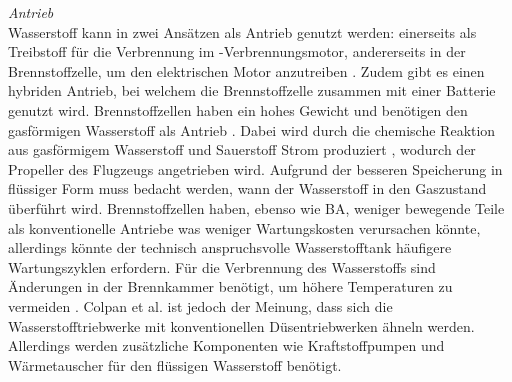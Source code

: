 \textit{Antrieb}\\
Wasserstoff kann in zwei Ansätzen als Antrieb genutzt werden: 
einerseits als Treibstoff für die Verbrennung im -Verbrennungsmotor,
andererseits in der Brennstoffzelle, um den elektrischen Motor anzutreiben \cite{sky2020hydrogen}. 
Zudem gibt es einen hybriden Antrieb, bei welchem die Brennstoffzelle zusammen mit einer Batterie genutzt wird.
%
Brennstoffzellen haben ein hohes Gewicht \cite{hepperle2012electric} und 
benötigen den gasförmigen Wasserstoff als Antrieb \cite{colpan2022fuel}.
Dabei wird durch die chemische Reaktion aus gasförmigem Wasserstoff  und Sauerstoff  Strom produziert \cite{dalmia2022powering}, 
wodurch der Propeller des Flugzeugs angetrieben wird. Aufgrund der besseren Speicherung in flüssiger Form muss bedacht werden, wann der Wasserstoff in den Gaszustand überführt wird. 
Brennstoffzellen haben, ebenso wie BA, weniger bewegende Teile als konventionelle Antriebe \cite{dalmia2022powering} was weniger Wartungskosten verursachen könnte,
allerdings könnte der technisch anspruchsvolle Wasserstofftank häufigere Wartungszyklen erfordern.
%
%
%
%
Für die Verbrennung des Wasserstoffs sind Änderungen in der Brennkammer benötigt, um höhere Temperaturen zu vermeiden \cite{khandelwal2013hydrogen}.
Colpan et al. \cite{colpan2022fuel} ist jedoch der Meinung, dass sich die Wasserstofftriebwerke mit konventionellen Düsentriebwerken ähneln werden. 
Allerdings werden zusätzliche Komponenten wie Kraftstoffpumpen und Wärmetauscher für den flüssigen Wasserstoff benötigt.
%
